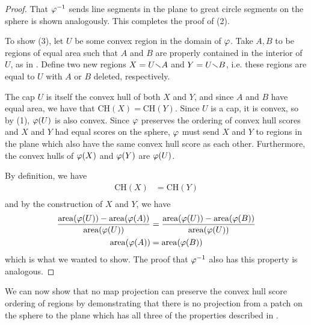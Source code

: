 \begin{proof}
		That $\varphi^{-1}$ sends line segments in the plane to great circle segments on the sphere is shown analogously.  
		This completes the proof of (2).
		
		
		
 To show (3), let $U$ be some convex region in the domain of $\varphi$.  Take $A,B$ to be regions of equal area such that $A$ and $B$ are properly contained in the interior of $U$, as in .  Define two new regions $X=U{\smallsetminus} A$ and $Y=U{\smallsetminus} B$, i.e. these regions are equal to $U$ with $A$ or $B$ deleted, respectively.  

The cap $U$ is itself the convex hull of both $X$ and $Y$, and since $A$ and $B$ have equal area, we have that $\mathrm{CH}(X) = \mathrm{CH}(Y)$.  Since $U$ is a cap, it is convex, so by (1), $\varphi(U)$ is also convex.  Since $\varphi$ preserves the ordering of convex hull scores and $X$ and $Y$ had equal scores on the sphere, $\varphi$ must send $X$ and $Y$ to regions in the plane which also have the same convex hull score as each other.  Furthermore, the convex hulls of $\varphi(X)$ and $\varphi(Y)$ are $\varphi(U)$.

By definition, we have
\begin{align*}
\mathrm{CH}(X) &= \mathrm{CH}(Y)\\
\end{align*}
and by the construction of $X$ and $Y$, we have 
\begin{align*}
\frac{\mathrm{area}(\varphi(U)) - \mathrm{area}(\varphi(A))}{\mathrm{area}(\varphi(U))} &= \frac{\mathrm{area}(\varphi(U)) - \mathrm{area}(\varphi(B))}{\mathrm{area}(\varphi(U))}\\
\mathrm{area}(\varphi(A)) &= \mathrm{area}(\varphi(B))
\end{align*}
 which is what we wanted to show.  The proof that $\varphi^{-1}$ also has this property is analogous.

\end{proof}

We can now show that no map projection can preserve the convex hull score ordering of regions by demonstrating that there is no projection from a patch on the sphere to the plane which has all three of the properties described  in . 


